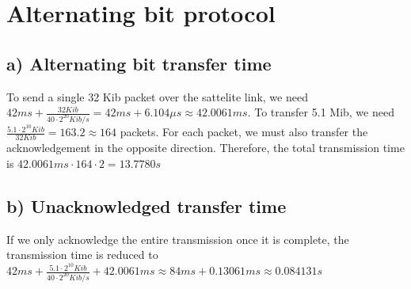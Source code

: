 \documentclass[a4paper, 11 pt, article, accentcolor=tud7b]{tudreport}
\begin{document}
	\section{Alternating bit protocol}
	
	\subsection*{a) Alternating bit transfer time}
	
	To send a single 32 Kib packet over the sattelite link, we need $42ms + \frac{32 Kib}{40 \cdot 2^{20} Kib/s} = 42ms + 6.104\mu s \approx 42.0061 ms$. To transfer 5.1 Mib, we need $\frac{5.1 \cdot 2^{10} Kib}{32 Kib} = 163.2 \approx 164$ packets. For each packet, we must also transfer the acknowledgement in the opposite direction. Therefore, the total transmission time is $42.0061ms \cdot 164 \cdot 2 = 13.7780s$
	
	\subsection*{b) Unacknowledged transfer time}
	If we only acknowledge the entire transmission once it is complete, the transmission time is reduced to $42ms + \frac{5.1 \cdot 2^{10} Kib}{40 \cdot 2^{20} Kib/s} + 42.0061ms \approx 84ms + 0.13061ms \approx 0.084131s$
\end{document}
